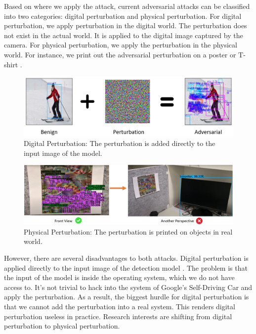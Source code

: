 Based on where we apply the attack, current adversarial attacks can be classified into two categories: digital perturbation and physical perturbation. For digital perturbation, we apply perturbation in the digital world. The perturbation does not exist in the actual world. It is applied to the digital image captured by the camera. For physical perturbation, we apply the perturbation in the physical world. For instance, we print out the adversarial perturbation on a poster \cite{lee2019physical} or T-shirt \cite{xu2020adversarial}.

\begin{figure}[H]
\centering
\includegraphics[scale=0.8]{figures/chapter_detection/digital.png}
\caption{Digital Perturbation: The perturbation is added directly to the input image of the model.}
\label{fig.adv_digital}
\end{figure}

\begin{figure}[H]
\centering
\includegraphics[scale=0.45]{figures/chapter_detection/physical.png}
\caption{Physical Perturbation: The perturbation is printed on objects in real world.}
\label{fig.adv_physical}
\end{figure}

However, there are several disadvantages to both attacks. Digital perturbation is applied directly to the input image of the detection model \cite{lu2017no}. The problem is that the input of the model is inside the operating system, which we do not have access to. It's not trivial to hack into the system of Google's Self-Driving Car and apply the perturbation. As a result, the biggest hurdle for digital perturbation is that we cannot add the perturbation into a real system. This renders digital perturbation useless in practice. Research interests are shifting from digital perturbation to physical perturbation. 

